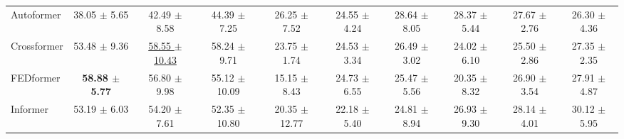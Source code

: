 \begin{table}[t]
{\begin{tabular}{lccccccccc}
Autoformer & 38.05 $\pm$ 5.65 & 42.49 $\pm$ 8.58 & 44.39 $\pm$ 7.25 & 26.25 $\pm$ 7.52 & 24.55 $\pm$ 4.24 & 28.64 $\pm$ 8.05 & 28.37 $\pm$ 5.44 & 27.67 $\pm$ 2.76 & 26.30 $\pm$ 4.36 \\
Crossformer & 53.48 $\pm$ 9.36 & \underline{58.55 $\pm$ 10.43} & 58.24 $\pm$ 9.71 & 23.75 $\pm$ 1.74 & 24.53 $\pm$ 3.34 & 26.49 $\pm$ 3.02 & 24.02 $\pm$ 6.10 & 25.50 $\pm$ 2.86 & 27.35 $\pm$ 2.35 \\
FEDformer & \textbf{58.88 $\pm$ 5.77} & 56.80 $\pm$ 9.98 & 55.12 $\pm$ 10.09 & 15.15 $\pm$ 8.43 & 24.73 $\pm$ 6.55 & 25.47 $\pm$ 5.56 & 20.35 $\pm$ 8.32 & 26.90 $\pm$ 3.54 & 27.91 $\pm$ 4.87 \\
Informer & 53.19 $\pm$ 6.03 & 54.20 $\pm$ 7.61 & 52.35 $\pm$ 10.80 & 20.35 $\pm$ 12.77 & 22.18 $\pm$ 5.40 & 24.81 $\pm$ 8.94 & 26.93 $\pm$ 9.30 & 28.14 $\pm$ 4.01 & 30.12 $\pm$ 5.95 \\
\bottomrule
\end{tabular}%
}
\end{table}
